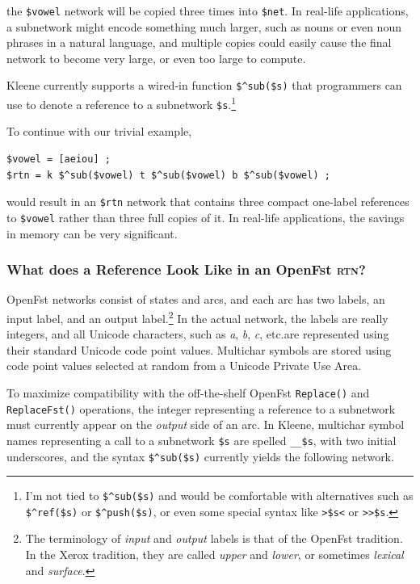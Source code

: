 \documentclass[letterpaper,12pt]{article}
\newcommand{\acro}{\textsc}
\begin{document}
\noindent
the \verb!$vowel! network will be copied three times into \verb!$net!.
In real-life applications, a subnetwork might encode something much
larger, such as nouns or even noun phrases in a natural language, and
multiple copies could easily cause the final network to become very
large, or even too large to compute.

Kleene currently supports a wired-in function \verb!$^sub($s)! that
programmers can use to denote a reference to a subnetwork \verb!$s!.\footnote{I'm
not tied to \verb!$^sub($s)! and would be comfortable with alternatives such
as \verb!$^ref($s)! or \verb!$^push($s)!, or even some special syntax like
\verb!>$s<! or \verb!>>$s!.} 

To continue with our trivial example, 

\begin{Verbatim}[fontsize=\small]
$vowel = [aeiou] ;
$rtn = k $^sub($vowel) t $^sub($vowel) b $^sub($vowel) ;
\end{Verbatim}

\noindent
would result in an \verb!$rtn! network that contains three compact
one-label references to \verb!$vowel! rather than three full copies of
it.  In real-life applications, the savings in memory can be very
significant.

\subsubsection{What does a Reference Look Like in an OpenFst \acro{rtn}?}

OpenFst networks consist of states and arcs, and each arc has two labels,
an input label, and an output label.\footnote{The terminology of
\emph{input} and \emph{output} labels is that of the OpenFst tradition.
In the Xerox tradition, they are called \emph{upper} and \emph{lower}, or
sometimes \emph{lexical} and \emph{surface}.}  In the actual network, the
labels are really integers, and all Unicode characters, such as \emph{a},
\emph{b}, \emph{c}, etc.\@ are represented using their standard Unicode
code point values.  Multichar symbols are stored using code point values
selected at random from a Unicode Private Use Area.

To maximize compatibility with the off-the-shelf OpenFst
\texttt{Replace()} and \texttt{ReplaceFst()} operations, the integer
representing a reference to a subnetwork must currently appear on the
\emph{output} side of an arc.  In Kleene, multichar symbol names
representing a call to a subnetwork \verb!$s! are spelled \verb!__$s!,
with two initial underscores, and the syntax \verb!$^sub($s)!  currently
yields the following network.
\end{document}
